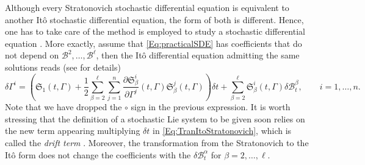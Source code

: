 \documentclass[11pt]{article}
\theoremstyle{plain}
\theoremstyle{definition}
\begin{document}
Although every Stratonovich stochastic differential equation is equivalent to another It\^{o} stochastic differential equation, the form of both is different. Hence, one has to take care of the method is employed to study a stochastic differential equation \cite{Ev13}. More exactly, assume that \eqref{Eq:practicalSDE} has coefficients that do not depend on $\mathcal{B}^2,\ldots,\mathcal{B}^\ell$, then the It\^{o} differential equation admitting the same solutions  reads (see \cite{BCC_01} for details)
\begin{equation}\label{Eq:TranItoStratonovich}
\delta \Gamma^i=\left(\mathfrak{S}_1(t,\Gamma)+\frac 12\sum_{\beta=2}^\ell\sum_{j=1}^n\frac{\partial \mathfrak{S}_\beta^i}{\partial \Gamma^j}(t,\Gamma)\mathfrak{S}_\beta^j(t,\Gamma)\right)\delta t +\sum_{\beta=2}^\ell \mathfrak{S}^i_\beta(t,\Gamma )\delta\mathcal{B}^\beta_t,\qquad i=1,\ldots,n.
\end{equation}
Note that we have dropped the $\circ$ sign in the previous expression.
It is worth stressing that the definition of a stochastic Lie system to be given soon relies on the new term appearing multiplying $\delta t$ in \eqref{Eq:TranItoStratonovich}, which is called the {\it drift term} \cite{BCC_01}. Moreover, the transformation from the Stratonovich to the Itô form does not change the coefficients with the $\delta\mathcal{B}^\alpha_t$ for $\beta = 2,\dotsc,\ell$.
\end{document}
